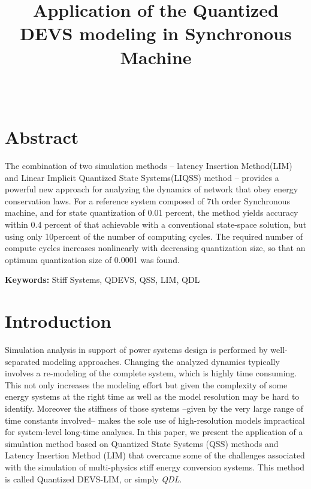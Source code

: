 \documentclass{article}
\theoremstyle{scsthe}
\begin{document}
\def\SCSconferenceacro{}
\def\SCSpublicationyear{}
\def\SCSconferencedates{}
\def\SCSconferencevenue{}

\graphicspath{{images/}{../images/}}

\title{Application of the Quantized DEVS modeling in Synchronous Machine}

\author{
\\
}

\maketitle

\section*{Abstract}
The combination of two simulation methods -- latency Insertion Method(LIM) and Linear Implicit Quantized State Systems(LIQSS) method – provides a powerful new approach for analyzing the dynamics of network that obey energy conservation laws. For a reference system composed of 7th order Synchronous machine, and for state quantization of 0.01 percent, the method yields accuracy within 0.4 percent of that achievable with a conventional state-space solution, but using only 10percent of the number of computing cycles. The required number of compute cycles increases nonlinearly with decreasing quantization size, so that an optimum quantization size of 0.0001 was found.

\textbf{Keywords:} Stiff Systems, QDEVS, QSS, LIM, QDL

\section{Introduction}
\label{sec:intro}

Simulation analysis in support of power systems design is performed by well-separated modeling approaches. Changing the analyzed dynamics typically involves a re-modeling of the complete system, which is highly time consuming. This not only increases the modeling effort but given the complexity of some energy systems at the right time as well as the model resolution may be hard to identify. Moreover the stiffness of those systems –given by the very large range of time constants involved– makes the sole use of high-resolution models impractical for system-level long-time analyses. In this paper, we present the application of a simulation method based on Quantized State Systems (QSS) methods and Latency Insertion Method (LIM) that overcame some of the challenges associated with the simulation of multi-physics stiff energy conversion systems. This method is called Quantized DEVS-LIM, or simply \emph{QDL}.
\end{document}
